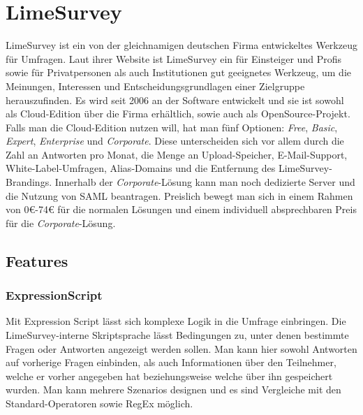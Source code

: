\section{LimeSurvey}

LimeSurvey ist ein von der gleichnamigen deutschen Firma entwickeltes Werkzeug für Umfragen.
Laut ihrer Website ist LimeSurvey ein für Einsteiger und Profis sowie für Privatpersonen als auch Institutionen gut geeignetes Werkzeug, um die Meinungen, Interessen und Entscheidungsgrundlagen einer Zielgruppe herauszufinden.
Es wird seit 2006 an der Software entwickelt und sie ist sowohl als Cloud-Edition über die Firma erhältlich, sowie auch als OpenSource-Projekt.\\

Falls man die Cloud-Edition nutzen will, hat man fünf Optionen: \textit{Free}, \textit{Basic}, \textit{Expert}, \textit{Enterprise} und \textit{Corporate}.
Diese unterscheiden sich vor allem durch die Zahl an Antworten pro Monat, die Menge an Upload-Speicher, E-Mail-Support, White-Label-Umfragen, Alias-Domains und die Entfernung des LimeSurvey-Brandings.
Innerhalb der \textit{Corporate}-Lösung kann man noch dedizierte Server und die Nutzung von SAML beantragen.
Preislich bewegt man sich in einem Rahmen von 0€-74€ für die normalen Lösungen und einem individuell absprechbaren Preis für die \textit{Corporate}-Lösung.

\subsection{Features}
\subsubsection{ExpressionScript}
\label{m:expr_script}
Mit Expression Script lässt sich komplexe Logik in die Umfrage einbringen.
Die LimeSurvey-interne Skriptsprache lässt Bedingungen zu, unter denen bestimmte Fragen oder Antworten angezeigt werden sollen.
Man kann hier sowohl Antworten auf vorherige Fragen einbinden, als auch Informationen über den Teilnehmer, welche er vorher angegeben hat beziehungsweise welche über ihn gespeichert wurden.
Man kann mehrere Szenarios designen und es sind Vergleiche mit den Standard-Operatoren sowie RegEx möglich.

